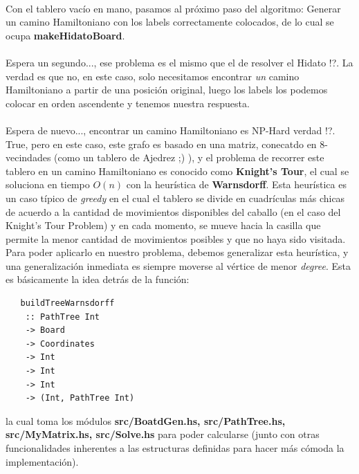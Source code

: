 \documentclass[a4paper, 12pt]{article}
\begin{document}
\paragraph{}
Con el tablero vac\'io en mano, pasamos al pr\'oximo paso del algoritmo: Generar un camino Hamiltoniano con los labels correctamente
colocados, de lo cual se ocupa \textbf{makeHidatoBoard}.

\paragraph{}
Espera un segundo..., ese problema es el mismo que el de resolver el Hidato !?. La verdad es que no, en este caso, solo
necesitamos encontrar \textit{un} camino Hamiltoniano a partir de una posici\'on original, luego los labels los podemos colocar
en orden ascendente y tenemos nuestra respuesta.

\paragraph{}
Espera de nuevo..., encontrar un camino Hamiltoniano es NP-Hard verdad !?. True, pero en este caso, este grafo es basado en una
matriz, conecatdo en 8-vecindades (como un tablero de Ajedrez ;) ), y el problema de recorrer este tablero en un camino Hamiltoniano es conocido como \textbf{Knight's Tour},
el cual se soluciona en tiempo $O(n)$ con la heur\'istica de \textbf{Warnsdorff}. Esta heur\'istica es un caso t\'ipico de \textit{greedy}
en el cual el tablero se divide en cuadrículas m\'as chicas de acuerdo a la cantidad de movimientos disponibles del caballo (en el caso
del Knight's Tour Problem) y en cada momento, se mueve hacia la casilla que permite la menor cantidad de movimientos
posibles y que no haya sido visitada. Para poder aplicarlo en nuestro problema, debemos generalizar esta heur\'istica, y una generalizaci\'on inmediata es siempre
moverse al v\'ertice de menor \textit{degree}. Esta es b\'asicamente la idea detr\'as de la funci\'on:

\begin{verbatim}
   buildTreeWarnsdorff
    :: PathTree Int
    -> Board
    -> Coordinates
    -> Int
    -> Int
    -> Int
    -> (Int, PathTree Int)
\end{verbatim}

la cual toma los m\'odulos \textbf{src/BoatdGen.hs, src/PathTree.hs, src/MyMatrix.hs, src/Solve.hs} para
poder calcularse (junto con otras funcionalidades inherentes a las estructuras definidas para hacer m\'as
c\'omoda la implementaci\'on).
\end{document}
